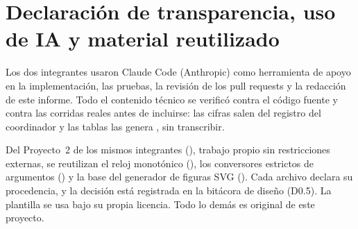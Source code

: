\section*{Declaración de transparencia, uso de IA y material reutilizado}

Los dos integrantes usaron Claude Code (Anthropic) como herramienta de apoyo
en la implementación, las pruebas, la revisión de los pull requests y la
redacción de este informe. Todo el contenido técnico se verificó contra el
código fuente y contra las corridas reales antes de incluirse: las cifras
salen del registro del coordinador y las tablas las genera
, sin transcribir.

Del Proyecto~2 de los mismos integrantes (), trabajo
propio sin restricciones externas, se reutilizan el reloj monotónico
(), los conversores estrictos de argumentos
() y la base del generador de figuras SVG
(). Cada archivo declara su procedencia, y la
decisión está registrada en la bitácora de diseño (D0.5). La plantilla
 se usa bajo su propia licencia. Todo lo demás es original de
este proyecto.
